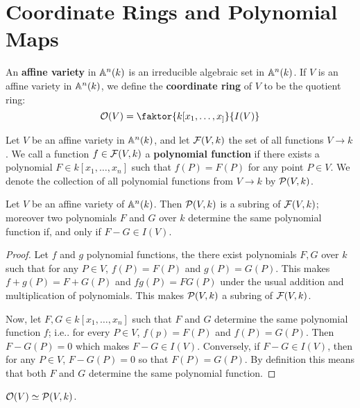 \section{Coordinate Rings and Polynomial Maps}

\begin{definition}
  An \textbf{affine variety} in $\mathbb{A}^n(k)$ is an irreducible algebraic set in
  $\mathbb{A}^n(k)$. If $V$ is an affine variety in  $\mathbb{A}^n(k)$, we define the
  \textbf{coordinate ring} of $V$ to be the quotient ring:
  \begin{equation*}
    \Oc(V)=\faktor{k[x_1, \dots, x_]}{I(V)}
  \end{equation*}
\end{definition}

\begin{definition}
  Let $V$ be an affine variety in  $\mathbb{A}^n(k)$, and let $\mathcal{F}(V,k)$ the set of all
  functions $V \xrightarrow{} k$. We call a function $f \in \mathcal{F}(V,k)$ a
  \textbf{polynomial function} if there exists a polynomial $F \in k[x_1, \dots,
  x_n]$ such that $f(P)=F(P)$ for any point $P \in V$. We denote the collection
  of all polynomial functions from $V \xrightarrow{} k$ by $\mathcal{P}(V,k)$.
\end{definition}

\begin{theorem}\label{theorem_2.1.1}
  Let $V$ be an affine variety of  $\mathbb{A}^n(k)$. Then $\mathcal{P}(V,k)$ is a subring of
  $\mathcal{F}(V,k)$; moreover two polynomials $F$ and $G$ over $k$ determine the same
  polynomial function if, and only if $F-G \in I(V)$.
\end{theorem}
\begin{proof}
  Let $f$ and  $g$ polynomial functions, the there exist polynomials $F,G$ over $k$
  such that for any  $P \in V$, $f(P)=F(P)$ and $g(P)=G(P)$. This makes
  $f+g(P)=F+G(P)$ and $fg(P)=FG(P)$ under the usual addition and multiplication
  of polynomials. This makes $\mathcal{P}(V,k)$ a subring of $\mathcal{F}(V,k)$.

  Now, let $F,G \in k[x_1, \dots, x_n]$ such that $F$ and  $G$ determine the
  same polynomial function  $f$; i.e.. for every $P \in V$, $f(p)=F(P)$ and
  $f(P)=G(P)$. Then $F-G(P)=0$ which makes $F-G \in I(V)$. Conversely, if $F-G
  \in I(V)$, then for any $P \in V$, $F-G(P)=0$ so that $F(P)=G(P)$. By
  definition this means that both $F$ and  $G$ determine the same polynomial
  function.
\end{proof}
\begin{corollary}
  $\mathcal{O}(V) \simeq \mathcal{P}(V,k)$.
\end{corollary}

